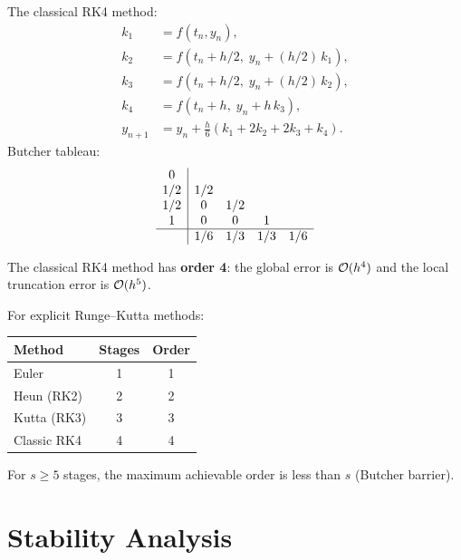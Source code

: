 \begin{definition}[RK4]
\label{def:rk4}
The classical RK4 method:
\begin{align*}
    k_1 &= f(t_n, y_n), \\
    k_2 &= f(t_n + h/2, \; y_n + (h/2)\,k_1), \\
    k_3 &= f(t_n + h/2, \; y_n + (h/2)\,k_2), \\
    k_4 &= f(t_n + h, \; y_n + h\,k_3), \\
    y_{n+1} &= y_n + \frac{h}{6}(k_1 + 2k_2 + 2k_3 + k_4).
\end{align*}
Butcher tableau:
\[
\begin{array}{c|cccc}
    0   &     &     &     &   \\
    1/2 & 1/2 &     &     &   \\
    1/2 & 0   & 1/2 &     &   \\
    1   & 0   & 0   & 1   &   \\
    \hline
        & 1/6 & 1/3 & 1/3 & 1/6
\end{array}
\]
\end{definition}

\begin{theorem}[Order of RK4]
\label{thm:rk4-order}
The classical RK4 method has \textbf{order 4}: the global error is $\mathcal{O}(h^4)$ and the local truncation error is $\mathcal{O}(h^5)$.
\end{theorem}

\begin{remark}
For explicit Runge--Kutta methods:
\begin{center}
\begin{tabular}{lcc}
    \toprule
    \textbf{Method} & \textbf{Stages} & \textbf{Order} \\
    \midrule
    Euler       & 1 & 1 \\
    Heun (RK2)  & 2 & 2 \\
    Kutta (RK3) & 3 & 3 \\
    Classic RK4 & 4 & 4 \\
    \bottomrule
\end{tabular}
\end{center}
For $s \geq 5$ stages, the maximum achievable order is less than $s$ (Butcher barrier).
\end{remark}

\section{Stability Analysis}

